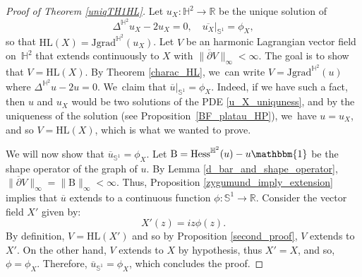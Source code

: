 \documentclass[10pt]{amsart}
\theoremstyle{plain}
\theoremstyle{definition}
\newcommand{\grad}{\mathrm{grad}^{\mathbb{H}^2}}
\newcommand{\hess}{\mathrm{Hess}^{\mathbb{H}^2}}
\newcommand{\J}{\mathrm{J}}
\newcommand{\B}{\mathrm{B}}
\begin{document}
\begin{proof}[Proof of Theorem \ref{uniqTH1HL}]
Let $u_X:\mathbb{H}^2\to\mathbb{R}$ be the unique solution of
\begin{equation}\label{u_X_uniquness}
\Delta^{\mathbb{H}^2} u_X-2u_X=0, \quad
\overline{u_X}|_{\mathbb{S}^1}=\phi_X,
\end{equation}
so that $\mathrm{HL}(X)=\J\grad(u_X)$.
Let $V$ be an harmonic Lagrangian vector field on~$\mathbb{H}^2$ that extends continuously to $X$ with $\lVert\overline{\partial}V\rVert_{\infty}\!<\! \infty$. The goal is to show that $V\!=\!\mathrm{HL}(X)$. By Theorem \ref{charac_HL}, we~can write $V=\J\grad(u)$ where $\Delta^{\mathbb{H}^2}u-2u=0$. We~claim that $\overline{u}|_{\mathbb{S}^1}=\phi_X$. Indeed, if we have such a fact, then $u$ and $u_X$ would be two solutions of the PDE \eqref{u_X_uniquness}, and by the uniqueness of the solution (see Proposition~\ref{BF_platau_HP}), we~have $u=u_X$, and so $V=\mathrm{HL}(X)$, which is what we wanted to prove.

We will now show that $\overline{u}_{\mathbb{S}^1}=\phi_X$. Let $\B=\hess(u)-u\mathbbm{1}$ be the shape operator of the graph of $u$. By Lemma \ref{d_bar_and_shape_operator}, $\lVert\overline{\partial} V\rVert_{\infty}=\lVert \B\rVert_{\infty}<\infty$. Thus, Proposition \ref{zygumund_imply_extension} implies that $\overline{u}$ extends to a continuous function $\phi:\mathbb{S}^1\to\mathbb{R}$. Consider the vector field $X'$ given by:
\[
X'(z)=iz\phi(z).
\]
By definition, $V=\mathrm{HL}(X')$ and so by Proposition \ref{second_proof}, $V$ extends to $X'$. On the other hand, $V$ extends to $X$ by hypothesis, thus $X'=X$, and so, $\phi=\phi_X$. Therefore, $\overline{u}_{\mathbb{S}^1}=\phi_X$, which concludes the proof.
\end{proof}
\end{document}
